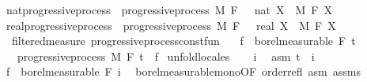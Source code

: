 \begin{isabellebody}
\endisatagproof
{\isafoldproof}%
%
\isadelimproof
\isanewline
%
\endisadelimproof
\isanewline
{}\isamarkupfalse%
\isanewline
\isanewline
{}\isamarkupfalse%
\ nat{\isacharunderscore}{\kern0pt}progressive{\isacharunderscore}{\kern0pt}process\ {\isacharequal}{\kern0pt}\ progressive{\isacharunderscore}{\kern0pt}process\ M\ F\ {\isachardoublequoteopen}{}\ {\isacharcolon}{\kern0pt}{\isacharcolon}{\kern0pt}\ nat{\isachardoublequoteclose}\ X\ \ M\ F\ X\isanewline
{}\isamarkupfalse%
\ real{\isacharunderscore}{\kern0pt}progressive{\isacharunderscore}{\kern0pt}process\ {\isacharequal}{\kern0pt}\ progressive{\isacharunderscore}{\kern0pt}process\ M\ F\ {\isachardoublequoteopen}{}\ {\isacharcolon}{\kern0pt}{\isacharcolon}{\kern0pt}\ real{\isachardoublequoteclose}\ X\ \ M\ F\ X\isanewline
\isanewline
{}\isamarkupfalse%
\ {\isacharparenleft}{\kern0pt}\ filtered{\isacharunderscore}{\kern0pt}measure{\isacharparenright}{\kern0pt}\ progressive{\isacharunderscore}{\kern0pt}process{\isacharunderscore}{\kern0pt}const{\isacharunderscore}{\kern0pt}fun{\isacharcolon}{\kern0pt}\isanewline
\ \ \ {\isachardoublequoteopen}f\ {\isasymin}\ borel{\isacharunderscore}{\kern0pt}measurable\ {\isacharparenleft}{\kern0pt}F\ t\isanewline
\ \ \ {\isachardoublequoteopen}progressive{\isacharunderscore}{\kern0pt}process\ M\ F\ t\ {\isacharparenleft}{\kern0pt}{\isasymlambda}{\isacharunderscore}{\kern0pt}{\isachardot}{\kern0pt}\ f{\isacharparenright}{\kern0pt}{\isachardoublequoteclose}\isanewline
%
\isadelimproof
%
\endisadelimproof
%
\isatagproof
{}\isamarkupfalse%
\ {\isacharparenleft}{\kern0pt}unfold{\isacharunderscore}{\kern0pt}locales{\isacharparenright}{\kern0pt}\isanewline
\ \ \isamarkupfalse%
\ i\ \isamarkupfalse%
\ asm{\isacharcolon}{\kern0pt}\ {\isachardoublequoteopen}t\ {\isasymle}\ i{\isachardoublequoteclose}\isanewline
\ \ \isamarkupfalse%
\ {\isachardoublequoteopen}f\ {\isasymin}\ borel{\isacharunderscore}{\kern0pt}measurable\ {\isacharparenleft}{\kern0pt}F\ i{\isacharparenright}{\kern0pt}{\isachardoublequoteclose}\ \isamarkupfalse%
\ borel{\isacharunderscore}{\kern0pt}measurable{\isacharunderscore}{\kern0pt}mono{\isacharbrackleft}{\kern0pt}OF\ order{\isachardot}{\kern0pt}refl\ asm{\isacharbrackright}{\kern0pt}\ assms\ \isamarkupfalse%

\end{isabellebody}
